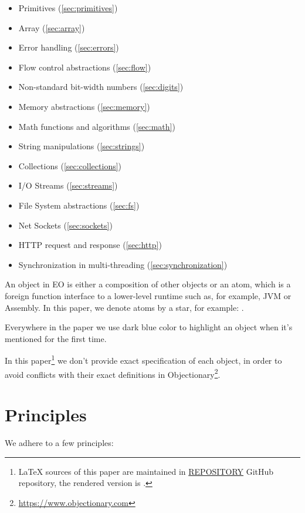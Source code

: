 \documentclass[sigplan,11pt,nonacm,natbib=false]{acmart}
\newcommand\aff[1]{\ff{\textcolor{gray}{$\star$}#1}}
\begin{document}
\begin{itemize}
    \item Primitives (\cref{sec:primitives})
    \item Array (\cref{sec:array})
    \item Error handling (\cref{sec:errors})
    \item Flow control abstractions (\cref{sec:flow})
    \item Non-standard bit-width numbers (\cref{sec:digits})
    \item Memory abstractions (\cref{sec:memory})
    \item Math functions and algorithms (\cref{sec:math})
    \item String manipulations (\cref{sec:strings})
    \item Collections (\cref{sec:collections})
    \item I/O Streams (\cref{sec:streams})
    \item File System abstractions (\cref{sec:fs})
    \item Net Sockets (\cref{sec:sockets})
    \item HTTP request and response (\cref{sec:http})
    \item Synchronization in multi-threading (\cref{sec:synchronization})
\end{itemize}

An object in EO is either a composition of other objects or an atom, which is a foreign function interface to a lower-level runtime such as, for example, JVM or Assembly. In this paper, we denote atoms by a star, for example: \aff{times}.

Everywhere in the paper we use dark blue color to highlight an object when it's mentioned for the first time.

In this paper\footnote{%
\LaTeX{} sources of this paper are maintained in
\href{https://github.com/REPOSITORY}{REPOSITORY} GitHub repository,
the rendered version is \href{https://github.com/REPOSITORY/releases/tag/0.0.0}{}.}
we don't provide exact specification of each object, in order to avoid
conflicts with their exact definitions in Objectionary\footnote{\url{https://www.objectionary.com}}.

\section{Principles}

We adhere to a few principles:
\end{document}
